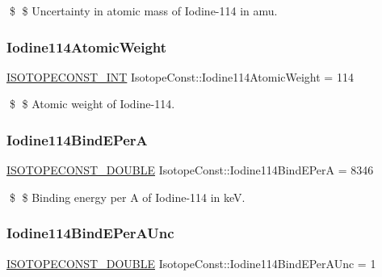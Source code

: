 \$ \$ Uncertainty in atomic mass of Iodine-\/114 in amu. \mbox{\label{group___isotope_const-_iodine-_i114_gace89af186c85ce9c80e3563e624d6801}} 
\subsubsection{\texorpdfstring{Iodine114\+Atomic\+Weight}{Iodine114AtomicWeight}}
{\footnotesize\ttfamily \mbox{\hyperlink{group___isotope_const-_macros_ga5f18360b3e99483a35c32d789e62621c}{I\+S\+O\+T\+O\+P\+E\+C\+O\+N\+S\+T\+\_\+\+I\+NT}} Isotope\+Const\+::\+Iodine114\+Atomic\+Weight = 114}

\$ \$ Atomic weight of Iodine-\/114. \mbox{\label{group___isotope_const-_iodine-_i114_ga657da4b558a12c5c1775869c92ea8072}} 
\subsubsection{\texorpdfstring{Iodine114\+Bind\+E\+PerA}{Iodine114BindEPerA}}
{\footnotesize\ttfamily \mbox{\hyperlink{group___isotope_const-_macros_ga8f45a7272ce02c0b4c65c44636ed719a}{I\+S\+O\+T\+O\+P\+E\+C\+O\+N\+S\+T\+\_\+\+D\+O\+U\+B\+LE}} Isotope\+Const\+::\+Iodine114\+Bind\+E\+PerA = 8346}

\$ \$ Binding energy per A of Iodine-\/114 in keV. \mbox{\label{group___isotope_const-_iodine-_i114_gacf807c38350d09b45cb058ab420e4422}} 
\subsubsection{\texorpdfstring{Iodine114\+Bind\+E\+Per\+A\+Unc}{Iodine114BindEPerAUnc}}
{\footnotesize\ttfamily \mbox{\hyperlink{group___isotope_const-_macros_ga8f45a7272ce02c0b4c65c44636ed719a}{I\+S\+O\+T\+O\+P\+E\+C\+O\+N\+S\+T\+\_\+\+D\+O\+U\+B\+LE}} Isotope\+Const\+::\+Iodine114\+Bind\+E\+Per\+A\+Unc = 1}

